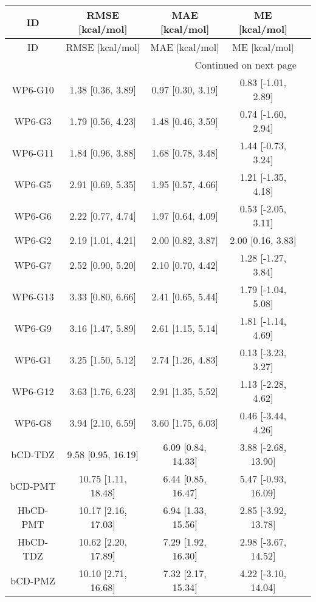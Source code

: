 \documentclass[8pt]{article}
\begin{document}
\begin{center}
\begin{footnotesize}
\begin{longtable}{|ccccc|}
\toprule
      ID &     RMSE [kcal/mol] &      MAE [kcal/mol] &       ME [kcal/mol] \\
\midrule
\endfirsthead

\toprule
      ID &     RMSE [kcal/mol] &      MAE [kcal/mol] &       ME [kcal/mol] \\
\midrule
\endhead
\midrule
\multicolumn{4}{r}{{Continued on next page}} \\
\midrule
\endfoot

\bottomrule
\endlastfoot
 WP6-G10 &   1.38 [0.36, 3.89] &   0.97 [0.30, 3.19] &  0.83 [-1.01, 2.89] \\
  WP6-G3 &   1.79 [0.56, 4.23] &   1.48 [0.46, 3.59] &  0.74 [-1.60, 2.94] \\
 WP6-G11 &   1.84 [0.96, 3.88] &   1.68 [0.78, 3.48] &  1.44 [-0.73, 3.24] \\
  WP6-G5 &   2.91 [0.69, 5.35] &   1.95 [0.57, 4.66] &  1.21 [-1.35, 4.18] \\
  WP6-G6 &   2.22 [0.77, 4.74] &   1.97 [0.64, 4.09] &  0.53 [-2.05, 3.11] \\
  WP6-G2 &   2.19 [1.01, 4.21] &   2.00 [0.82, 3.87] &   2.00 [0.16, 3.83] \\
  WP6-G7 &   2.52 [0.90, 5.20] &   2.10 [0.70, 4.42] &  1.28 [-1.27, 3.84] \\
 WP6-G13 &   3.33 [0.80, 6.66] &   2.41 [0.65, 5.44] &  1.79 [-1.04, 5.08] \\
  WP6-G9 &   3.16 [1.47, 5.89] &   2.61 [1.15, 5.14] &  1.81 [-1.14, 4.69] \\
  WP6-G1 &   3.25 [1.50, 5.12] &   2.74 [1.26, 4.83] &  0.13 [-3.23, 3.27] \\
 WP6-G12 &   3.63 [1.76, 6.23] &   2.91 [1.35, 5.52] &  1.13 [-2.28, 4.62] \\
  WP6-G8 &   3.94 [2.10, 6.59] &   3.60 [1.75, 6.03] &  0.46 [-3.44, 4.26] \\
 bCD-TDZ &  9.58 [0.95, 16.19] &  6.09 [0.84, 14.33] & 3.88 [-2.68, 13.90] \\
 bCD-PMT & 10.75 [1.11, 18.48] &  6.44 [0.85, 16.47] & 5.47 [-0.93, 16.09] \\
HbCD-PMT & 10.17 [2.16, 17.03] &  6.94 [1.33, 15.56] & 2.85 [-3.92, 13.78] \\
HbCD-TDZ & 10.62 [2.20, 17.89] &  7.29 [1.92, 16.30] & 2.98 [-3.67, 14.52] \\
 bCD-PMZ & 10.10 [2.71, 16.68] &  7.32 [2.17, 15.34] & 4.22 [-3.10, 14.04] \\

\end{longtable}
\end{footnotesize}
\end{center}
\end{document}
